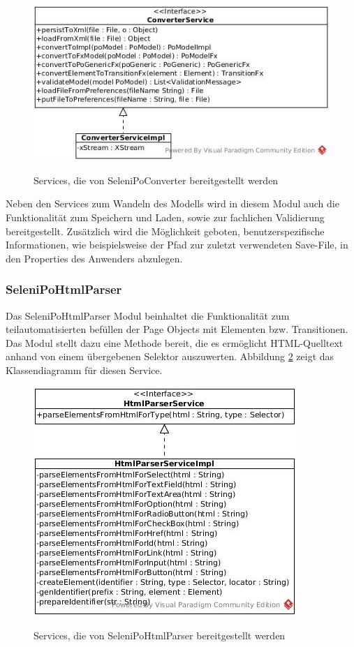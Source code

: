 \begin{figure}[htb]
  \centering  
  \includegraphics[scale=0.5]{img/ConverterService.jpg}\\
  \caption{Services, die von SeleniPoConverter bereitgestellt werden}
  \label{fig:converter_service}
\end{figure}

Neben den Services zum Wandeln des Modells wird in diesem Modul auch die Funktionalität zum Speichern und Laden, sowie zur fachlichen Validierung bereitgestellt.
Zusätzlich wird die Möglichkeit geboten, benutzerspezifische Informationen, wie beispielsweise der Pfad zur zuletzt verwendeten Save-File, in den Properties des Anwenders abzulegen.


\subsubsection{SeleniPoHtmlParser}
\label{sec:selenipohtmlparser}

Das SeleniPoHtmlParser Modul beinhaltet die Funktionalität zum teilautomatisierten befüllen der Page Objects mit Elementen bzw. Transitionen.
Das Modul stellt dazu eine Methode bereit, die es ermöglicht HTML-Quelltext anhand von einem übergebenen Selektor auszuwerten.
Abbildung \ref{fig:html_service} zeigt das Klassendiagramm für diesen Service.

\begin{figure}[htb]
  \centering  
  \includegraphics[scale=0.5]{img/HtmlParserService.jpg}\\
  \caption{Services, die von SeleniPoHtmlParser bereitgestellt werden}
  \label{fig:html_service}
\end{figure}

